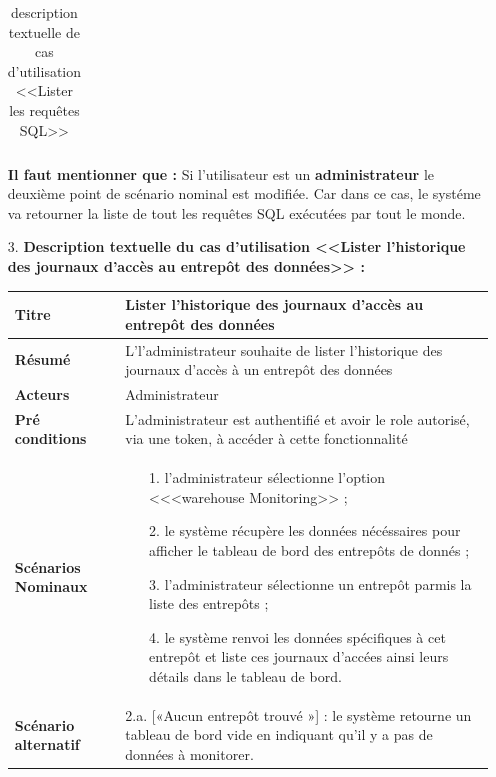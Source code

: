 \begin{enumerate}
\begin{table}[H]
\begin{tabular}{|p{3.5cm}|p{12cm}|}
                \hline 
            \end{tabular}
        \caption{description textuelle de cas d'utilisation <<Lister les requêtes SQL>>}
        \end{table}
        \par \textbf{Il faut mentionner que  : } Si l'utilisateur est un \textbf{administrateur} le deuxième point de scénario nominal est modifiée. 
        Car dans ce cas, le systéme va retourner la liste de tout les requêtes SQL exécutées par tout le monde.
\newpage
\vspace{2cm}
        \item[3.] \textbf{Description textuelle du cas d'utilisation <<Lister l'historique des journaux d'accès au entrepôt des données>> :}
    \begin{table}[H]
        \centering
        \begin{tabular}{|p{3.5cm}|p{12cm}|}
            \hline \textbf{Titre} &  Lister l'historique des journaux d'accès au entrepôt des données\\
            \hline \textbf{Résumé} & L'l'administrateur souhaite de lister l'historique des journaux d'accès à un entrepôt des données \\
            \hline \textbf{Acteurs} & Administrateur \\
            \hline \textbf{Pré conditions }& L'administrateur est authentifié et avoir le role autorisé, via une token, à accéder à cette fonctionnalité\\
            \hline \textbf{Scénarios Nominaux} &
                \begin{enumerate}
                    \item [1.] l'administrateur sélectionne l'option <<<warehouse Monitoring>> ;
                    \item [2.] le système récupère les données nécéssaires pour afficher le tableau de bord des entrepôts de donnés  ;
                    \item [3.] l'administrateur sélectionne un entrepôt parmis la liste des entrepôts ;
                    \item [4.] le système renvoi les données spécifiques à cet entrepôt et liste ces journaux d'accées ainsi leurs détails dans le tableau de bord.      
                \end{enumerate}\\
                    \hline \textbf{Scénario alternatif} & 
                    2.a. \hspace{0.3cm} [«Aucun entrepôt trouvé »] : le système retourne un tableau de bord vide en indiquant qu'il y a pas de données à monitorer.\\

\end{tabular}
\end{table}
\end{enumerate}
